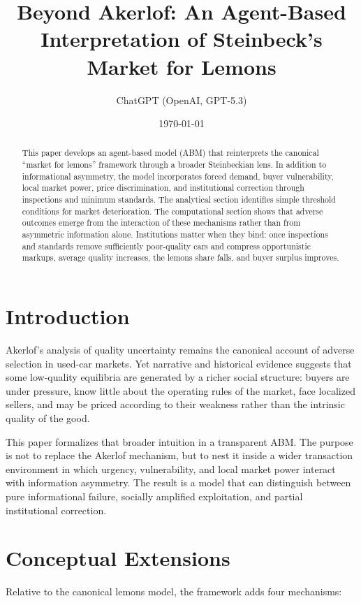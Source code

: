 \documentclass[12pt]{article}
\title{Beyond Akerlof: An Agent-Based Interpretation of Steinbeck's Market for Lemons}
\author{ChatGPT (OpenAI, GPT-5.3)}
\date{\today}
\begin{document}
\maketitle

\begin{abstract}
This paper develops an agent-based model (ABM) that reinterprets the canonical ``market for lemons'' framework through a broader Steinbeckian lens. In addition to informational asymmetry, the model incorporates forced demand, buyer vulnerability, local market power, price discrimination, and institutional correction through inspections and minimum standards. The analytical section identifies simple threshold conditions for market deterioration. The computational section shows that adverse outcomes emerge from the interaction of these mechanisms rather than from asymmetric information alone. Institutions matter when they bind: once inspections and standards remove sufficiently poor-quality cars and compress opportunistic markups, average quality increases, the lemons share falls, and buyer surplus improves.
\end{abstract}

\section{Introduction}

Akerlof's analysis of quality uncertainty remains the canonical account of adverse selection in used-car markets. Yet narrative and historical evidence suggests that some low-quality equilibria are generated by a richer social structure: buyers are under pressure, know little about the operating rules of the market, face localized sellers, and may be priced according to their weakness rather than the intrinsic quality of the good.

This paper formalizes that broader intuition in a transparent ABM. The purpose is not to replace the Akerlof mechanism, but to nest it inside a wider transaction environment in which urgency, vulnerability, and local market power interact with information asymmetry. The result is a model that can distinguish between pure informational failure, socially amplified exploitation, and partial institutional correction.

\section{Conceptual Extensions}

Relative to the canonical lemons model, the framework adds four mechanisms:
\end{document}
